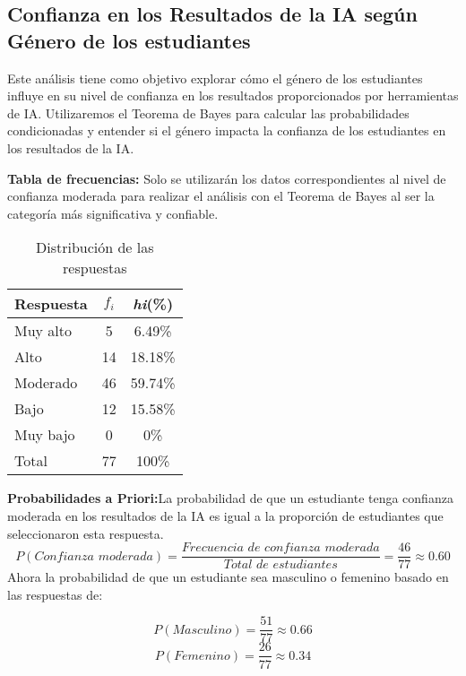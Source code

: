 \subsection{Confianza en los Resultados de la IA según Género de los estudiantes}
Este análisis tiene como objetivo explorar cómo el género de los estudiantes influye en su nivel de confianza en los resultados proporcionados por herramientas de IA. Utilizaremos el Teorema de Bayes para calcular las probabilidades condicionadas y entender si el género impacta la confianza de los estudiantes en los resultados de la IA.

\textbf{Tabla de frecuencias:}
Solo se utilizarán los datos correspondientes al nivel de confianza moderada para realizar el análisis con el Teorema de Bayes al ser la categoría más significativa y confiable.
\begin{table}[H]
	\centering
	\renewcommand{\arraystretch}{1.2}
	\begin{tabular}{l c c}
		\hline
		{Respuesta} & {\(f_i\)} & \textit{hi}(\%)\\
		\hline
		Muy alto    & 5  & 6.49\%\\
		Alto        & 14 & 18.18\%\\
		Moderado    & 46 & 59.74\%\\
		Bajo        & 12 & 15.58\%\\
		Muy bajo    & 0  & 0\%\\
		\hline
		Total       & 77 & 100\%\\
		\hline
	\end{tabular}
	\caption{Distribución de las respuestas}
	\label{tabla:confianzaEnResultados}
\end{table}

\textbf{Probabilidades a Priori:}La probabilidad de que un estudiante tenga confianza moderada en los resultados de la IA es igual a la proporción de estudiantes que seleccionaron esta respuesta.
\begin{equation*}
	P(\textit{Confianza moderada}) = \frac{\textit{Frecuencia de confianza moderada}}{\textit{Total de estudiantes}} = \frac{46}{77} \approx 0.60
\end{equation*}
Ahora la probabilidad de que un estudiante sea masculino o femenino basado en las respuestas de:
\begin{multicols}{2}
	\begin{equation*}
		P(\textit{Masculino}) = \frac{51}{77} \approx 0.66
	\end{equation*}
	\begin{equation*}
		P(\textit{Femenino}) = \frac{26}{77} \approx 0.34
	\end{equation*}
\end{multicols}
\vspace{-0.5cm}

